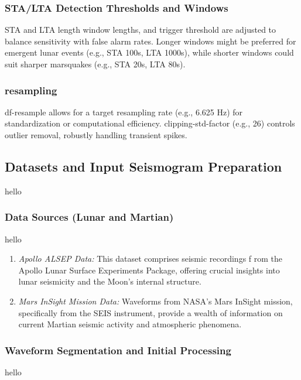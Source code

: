 \documentclass[conference]{IEEEtran}
\begin{document}
            \subsubsection{STA/LTA Detection Thresholds and Windows}
                STA and LTA length window lengths, and trigger threshold are adjusted to balance sensitivity with false
                alarm rates. Longer windows might be preferred for emergent lunar events (e.g., STA 100s, LTA 1000s), while
                shorter windows could suit sharper marsquakes (e.g., STA 20s, LTA 80s).
            \subsubsection{resampling}
                df-resample allows for a target resampling rate (e.g., 6.625 Hz) for standardization or computational efficiency.
                clipping-std-factor (e.g., 26) controls outlier removal, robustly handling transient spikes.
        
        \subsection{Datasets and Input Seismogram Preparation}
            hello
            \subsubsection{Data Sources (Lunar and Martian)}
                hello
                \begin{enumerate}[label=\alph*), leftmargin=3em]
                    \item \textit{Apollo ALSEP Data:} This dataset comprises seismic recordings f  rom the Apollo Lunar
                    Surface Experiments Package, offering crucial insights into lunar seismicity and the Moon's internal
                    structure.
                    \item \textit{Mars InSight Mission Data:} Waveforms from NASA's Mars InSight mission, specifically from
                    the SEIS instrument, provide a wealth of information on current Martian seismic activity and atmospheric
                    phenomena.
                \end{enumerate}
            \subsubsection{Waveform Segmentation and Initial Processing}
                hello
        
\end{document}
